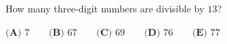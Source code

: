 How many three-digit numbers are divisible by $13$?

$\textbf{(A) }7\qquad\textbf{(B) }67\qquad\textbf{(C) }69\qquad\textbf{(D) }76\qquad\textbf{(E) }77$
